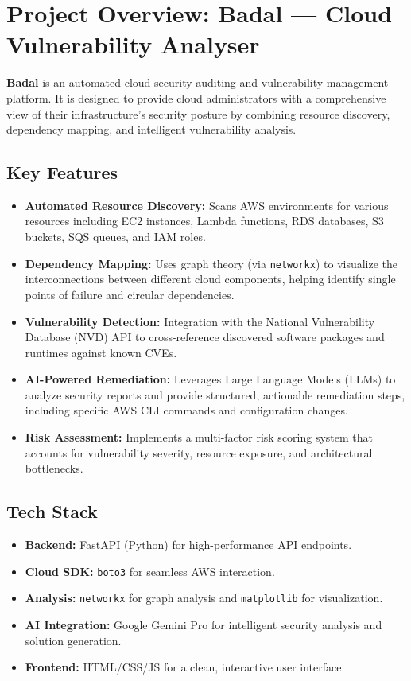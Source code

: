 \section{Project Overview: Badal — Cloud Vulnerability Analyser}

\textbf{Badal} is an automated cloud security auditing and vulnerability management platform. It is designed to provide cloud administrators with a comprehensive view of their infrastructure's security posture by combining resource discovery, dependency mapping, and intelligent vulnerability analysis.

\subsection{Key Features}
\begin{itemize}
    \item \textbf{Automated Resource Discovery:} Scans AWS environments for various resources including EC2 instances, Lambda functions, RDS databases, S3 buckets, SQS queues, and IAM roles.
    \item \textbf{Dependency Mapping:} Uses graph theory (via \texttt{networkx}) to visualize the interconnections between different cloud components, helping identify single points of failure and circular dependencies.
    \item \textbf{Vulnerability Detection:} Integration with the National Vulnerability Database (NVD) API to cross-reference discovered software packages and runtimes against known CVEs.
    \item \textbf{AI-Powered Remediation:} Leverages Large Language Models (LLMs) to analyze security reports and provide structured, actionable remediation steps, including specific AWS CLI commands and configuration changes.
    \item \textbf{Risk Assessment:} Implements a multi-factor risk scoring system that accounts for vulnerability severity, resource exposure, and architectural bottlenecks.
\end{itemize}

\subsection{Tech Stack}
\begin{itemize}
    \item \textbf{Backend:} FastAPI (Python) for high-performance API endpoints.
    \item \textbf{Cloud SDK:} \texttt{boto3} for seamless AWS interaction.
    \item \textbf{Analysis:} \texttt{networkx} for graph analysis and \texttt{matplotlib} for visualization.
    \item \textbf{AI Integration:} Google Gemini Pro for intelligent security analysis and solution generation.
    \item \textbf{Frontend:} HTML/CSS/JS for a clean, interactive user interface.
\end{itemize}

